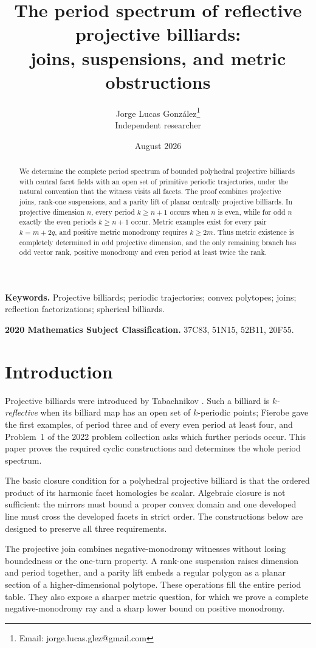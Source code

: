 \documentclass[11pt,a4paper]{article}
\title{The period spectrum of reflective projective billiards:\\
joins, suspensions, and metric obstructions}
\author{Jorge Lucas Gonz\'alez\thanks{Email: jorge.lucas.glez@gmail.com}\\
\small Independent researcher}
\date{August 2026}
\theoremstyle{plain}
\theoremstyle{definition}
\theoremstyle{remark}
\begin{document}
\maketitle
\begin{abstract}
We determine the complete period spectrum of bounded polyhedral projective
billiards with central facet fields with an open set of primitive periodic trajectories, under the natural
convention that the witness visits all facets. The proof combines projective
joins, rank-one suspensions, and a parity lift of planar centrally projective
billiards. In projective dimension $n$, every period $k\ge n+1$ occurs when $n$
is even, while for odd $n$ exactly the even periods $k\ge n+1$ occur. Metric
examples exist for every pair $k=m+2q$, and positive metric monodromy requires
$k\ge2m$. Thus metric existence is completely determined in odd projective
dimension, and the only remaining branch has odd vector rank, positive monodromy
and even period at least twice the rank.
\end{abstract}

\noindent\textbf{Keywords.} Projective billiards; periodic trajectories; convex
polytopes; joins; reflection factorizations; spherical billiards.

\medskip
\noindent\textbf{2020 Mathematics Subject Classification.}
37C83, 51N15, 52B11, 20F55.

\section{Introduction}
Projective billiards were introduced by Tabachnikov \cite{tab}.  Such a billiard
is \emph{$k$-reflective} when its billiard map has an open set of $k$-periodic
points; Fierobe \cite{fie-ex} gave the first examples, of period three and of
every even period at least four, and Problem~1 of the 2022 problem collection
\cite{opb} asks which further periods occur.  This paper proves the required cyclic constructions and determines the whole
period spectrum.

The basic closure condition for a polyhedral projective billiard is that the
ordered product of its harmonic facet homologies be scalar. Algebraic closure is
not sufficient: the mirrors must bound a proper convex domain and one developed
line must cross the developed facets in strict order. The constructions below
are designed to preserve all three requirements.

The projective join combines negative-monodromy witnesses without losing
boundedness or the one-turn property. A rank-one suspension raises dimension and
period together, and a parity lift embeds a regular polygon as a planar section of
a higher-dimensional polytope. These operations fill the entire period table.
They also expose a sharper metric question, for which we prove a complete
negative-monodromy ray and a sharp lower bound on positive monodromy.
\end{document}
